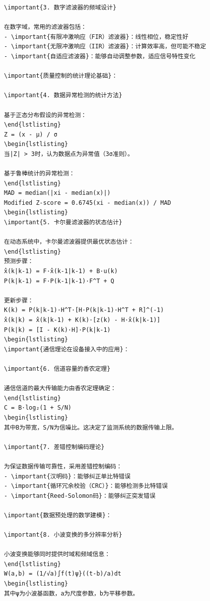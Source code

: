 \begin{verbatim}
\important{3. 数字滤波器的频域设计}

在数字域，常用的滤波器包括：
- \important{有限冲激响应（FIR）滤波器}：线性相位，稳定性好
- \important{无限冲激响应（IIR）滤波器}：计算效率高，但可能不稳定
- \important{自适应滤波器}：能够自动调整参数，适应信号特性变化

\important{质量控制的统计理论基础}：

\important{4. 数据异常检测的统计方法}

基于正态分布假设的异常检测：
\end{lstlisting}
Z = (x - μ) / σ
\begin{lstlisting}
当|Z| > 3时，认为数据点为异常值（3σ准则）。

基于鲁棒统计的异常检测：
\end{lstlisting}
MAD = median(|xi - median(x)|)
Modified Z-score = 0.6745(xi - median(x)) / MAD
\begin{lstlisting}
\important{5. 卡尔曼滤波器的状态估计}

在动态系统中，卡尔曼滤波器提供最优状态估计：
\end{lstlisting}
预测步骤：
x̂(k|k-1) = F·x̂(k-1|k-1) + B·u(k)
P(k|k-1) = F·P(k-1|k-1)·F^T + Q

更新步骤：
K(k) = P(k|k-1)·H^T·[H·P(k|k-1)·H^T + R]^(-1)
x̂(k|k) = x̂(k|k-1) + K(k)·[z(k) - H·x̂(k|k-1)]
P(k|k) = [I - K(k)·H]·P(k|k-1)
\begin{lstlisting}
\important{通信理论在设备接入中的应用}：

\important{6. 信道容量的香农定理}

通信信道的最大传输能力由香农定理确定：
\end{lstlisting}
C = B·log₂(1 + S/N)
\begin{lstlisting}
其中B为带宽，S/N为信噪比。这决定了监测系统的数据传输上限。

\important{7. 差错控制编码理论}

为保证数据传输可靠性，采用差错控制编码：
- \important{汉明码}：能够纠正单比特错误
- \important{循环冗余校验（CRC）}：能够检测多比特错误
- \important{Reed-Solomon码}：能够纠正突发错误

\important{数据预处理的数学建模}：

\important{8. 小波变换的多分辨率分析}

小波变换能够同时提供时域和频域信息：
\end{lstlisting}
W(a,b) = (1/√a)∫f(t)ψ}((t-b)/a)dt
\begin{lstlisting}
其中ψ为小波基函数，a为尺度参数，b为平移参数。


\end{verbatim}
